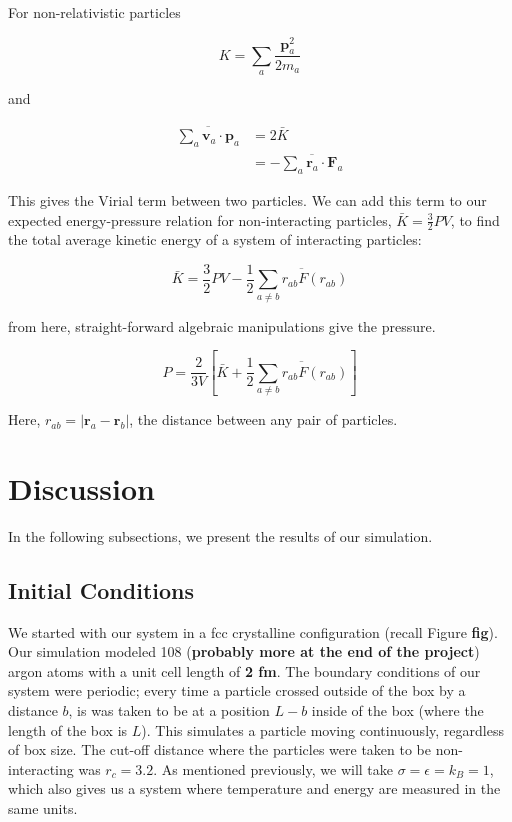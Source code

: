 \documentclass{article}
\begin{document}
\begin{multicols}{2}
\noindent  For non-relativistic particles 

\begin{equation}
K = \sum \limits _a \frac{\textbf{p}_{a}^2}{2m_a}
\end{equation}

\noindent and 

\begin{equation}
\begin{split}
\overline{\sum \limits _a \textbf{v}_a \cdot \textbf{p}_a} & = 2\bar{K} \\
& = - \overline{\sum \limits _a \textbf{r}_a \cdot \textbf{F}_a}
\end{split}
\end{equation}

\noindent This gives the Virial term between two particles.  We can add this term to our expected energy-pressure relation for non-interacting particles, $\bar{K}=\frac{3}{2}PV$, to find the total average kinetic energy of a system of interacting particles:  

\begin{equation}
\bar{K} = \frac{3}{2} PV - \frac{1}{2} \overline{\sum \limits _{a \ne b} r_{ab} F(r_{ab})}
\end{equation}

\noindent from here, straight-forward algebraic manipulations give the pressure.

\begin{equation}
P = \frac{2}{3V} \left [ \bar{K} + \frac{1}{2} \overline{\sum \limits _{a\ne b} r_{ab} F(r_{ab})} \right ]
\end{equation}

\noindent Here, $r_{ab} = |\textbf{r}_a - \textbf{r}_b|$, the distance between any pair of particles.

\section{Discussion}
\label{disc}
In the following subsections, we present the results of our simulation.

\subsection{Initial Conditions}

We started with our system in a fcc crystalline configuration (recall Figure \textbf{fig}).  Our simulation modeled  108 (\textbf{probably more at the end of the project}) argon atoms with a unit cell length of \textbf{2 fm}.  The boundary conditions of our system were periodic; every time a particle crossed outside of the box by a distance $b$, is was taken to be at a position $L-b$ inside of the box (where the length of the box is $L$).  This simulates a particle moving continuously, regardless of box size.  The cut-off distance where the particles were taken to be non-interacting was $r_c = 3.2$.  As mentioned previously, we will take $\sigma=\epsilon=k_B=1$, which also gives us a system where temperature and energy are measured in the same units.  


\end{multicols}
\end{document}
